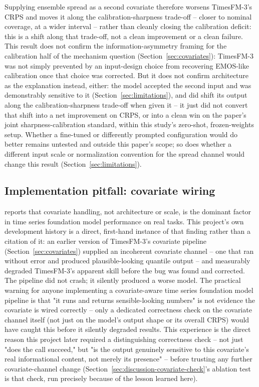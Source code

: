 Supplying ensemble spread as a second covariate therefore worsens
TimesFM-3's CRPS and moves it along the calibration-sharpness trade-off
-- closer to nominal coverage, at a wider interval -- rather than
cleanly closing the calibration deficit: this is a shift along that
trade-off, not a clean improvement or a clean failure. This result does
not confirm the information-asymmetry framing for the calibration half
of the mechanism question (Section~\ref{sec:covariates}): TimesFM-3 was
not simply prevented by an input-design choice from recovering EMOS-like
calibration once that choice was corrected. But it does not confirm
architecture as the explanation instead, either: the model accepted the
second input and was demonstrably sensitive to it
(Section~\ref{sec:limitations}), and did shift its output along the
calibration-sharpness trade-off when given it -- it just did not convert
that shift into a net improvement on CRPS, or into a clean win on the
paper's joint sharpness-calibration standard, within this study's
zero-shot, frozen-weights setup. Whether a fine-tuned or differently
prompted configuration would do better remains untested and outside this
paper's scope; so does whether a different input scale or normalization
convention for the spread channel would change this result
(Section~\ref{sec:limitations}).

\subsection{Implementation pitfall: covariate wiring}
\label{sec:pitfall}

\citet{kreusel_2026_covariates_key} reports that covariate handling, not
architecture or scale, is the dominant factor in time series foundation
model performance on real tasks. This project's own development history is
a direct, first-hand instance of that finding rather than a citation of
it: an earlier version of TimesFM-3's covariate pipeline
(Section~\ref{sec:covariates}) supplied an incoherent covariate channel --
one that ran without error and produced plausible-looking quantile output
-- and measurably degraded TimesFM-3's apparent skill before the bug was
found and corrected. The pipeline did not crash; it silently produced a
worse model. The practical warning for anyone implementing a
covariate-aware time series foundation model pipeline is that "it runs and
returns sensible-looking numbers" is not evidence the covariate is wired
correctly -- only a dedicated correctness check on the covariate channel
itself (not just on the model's output shape or its overall CRPS) would
have caught this before it silently degraded results. This experience is
the direct reason this project later required a distinguishing
correctness check -- not just "does the call succeed," but "is the
output genuinely sensitive to this covariate's real informational
content, not merely its presence" -- before trusting any further
covariate-channel change (Section~\ref{sec:discussion-covariate-check}'s
ablation test is that check, run precisely because of the lesson learned
here).

